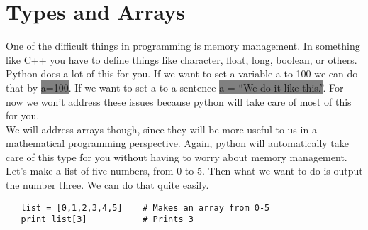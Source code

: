 \documentclass[11pt]{article}   %
\newcommand{\gray}[1]{\colorbox{gray}{#1}}
\begin{document}
\section*{Types and Arrays}
One of the difficult things in programming is memory management.  In something like C++ you have to define things like character, float, long, boolean, or others.  Python does a lot of
this for you.  If we want to set a variable a to 100 we can do that by \gray{a=100}.  If we want to set a to a sentence \gray{a = ``We do it like this.''}.  For now we won't address
these issues because python will take care of most of this for you.
\\
We will address arrays though, since they will be more useful to us in a mathematical programming perspective.  Again, python will automatically take care of this type for you without
having to worry about memory management.  Let's make a list of five numbers, from 0 to 5.  Then what we want to do is output the number three.  We can do that quite easily.
\begin{tcolorbox}
   \begin{lstlisting}
   list = [0,1,2,3,4,5]    # Makes an array from 0-5
   print list[3]           # Prints 3
   \end{lstlisting}
\end{tcolorbox}
\end{document}
